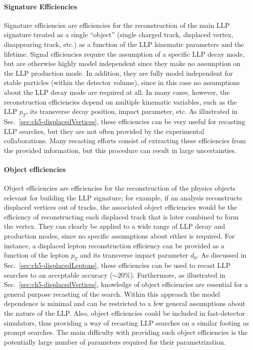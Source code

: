 \paragraph{Signature Efficiencies} Signature efficiencies are efficiencies for the reconstruction of the
main LLP signature treated as a single ``object'' (single charged track, displaced vertex, disappearing
track, etc.) as a function of the LLP kinematic parameters and
the lifetime.
Signal efficiencies require the assumption of a specific LLP decay mode, but
are otherwise highly model independent since they make no assumption on the LLP
production mode.
In addition, they are fully model independent for stable particles
(within the detector volume), since in this case no assumptions about
the LLP decay mode are required at all.
In many cases, however, the reconstruction efficiencies depend on multiple
kinematic variables, such as the LLP $p_T$, its transverse decay position, impact
parameter, etc.
As illustrated in Sec.~\ref{sec:ch5-displacedVertices}, these efficiencies
can be very useful for recasting LLP searches, but they
are not often provided by the experimental collaborations. Many recasting efforts consist of
extracting these efficiencies from the provided information, but
this procedure can result in large uncertainties.

\paragraph{Object efficiencies} Object efficiencies are efficiencies for the reconstruction of
the physics objects relevant for building the LLP signature; for example, if an analysis
reconstructs displaced vertices out of tracks, the associated object efficiencies would be
the efficiency of reconstructing each displaced track that is later combined to form the vertex.
They can clearly be applied to a wide range of LLP
decay and production modes, since no specific assumptions about either is
required.
For instance, a displaced lepton reconstruction efficiency can be provided
as a function of the lepton $p_T$ and its transverse impact parameter $d_{0}$.
As discussed in Sec.~\ref{sec:ch5-displacedLeptons}, these efficiencies
can be used to recast LLP searches to an acceptable accuracy ($\sim 20\%$).
Furthermore, as illustrated in Sec.~\ref{sec:ch5-displacedVertices},
knowledge of object efficiencies are essential for a general purpose
recasting of the search.
Within this approach the model dependence is minimal and can be
restricted to a few general assumptions about the nature of the LLP.
Also, object efficiencies could be included in fast-detector simulators, thus providing a way of recasting LLP searches
on a similar footing as prompt searches.
The main difficulty with providing such object efficiencies is
the potentially large number of parameters required for their parametrization.

